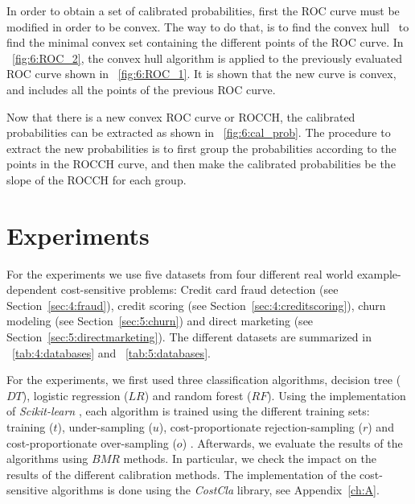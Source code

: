 In order to obtain a set of calibrated probabilities, first the ROC curve must be modified in 
order to be convex. The way to do that, is to find the convex \mbox{hull 
\citep{Hernandez-Orallo2012}} to find the minimal convex set containing the different 
points of the ROC curve. In \figurename{~\ref{fig:6:ROC_2}}, the convex hull algorithm is applied 
to the previously evaluated ROC curve shown in \figurename{~\ref{fig:6:ROC_1}}. It is shown that 
the new curve is convex, and includes all the points of the previous ROC curve.

Now that there is a new convex ROC curve or ROCCH, the calibrated probabilities can be extracted 
as shown in  \figurename{~\ref{fig:6:cal_prob}}. The procedure to extract the new probabilities is 
to first group the probabilities according to the points in the ROCCH curve, and then make the 
calibrated  probabilities be the slope of the ROCCH for each group.
  
   
\section{Experiments}
\label{sec:6:experiments}

For the experiments we use five datasets from four different real world example-dependent 
cost-sensitive problems: Credit card fraud detection (see Section~\ref{sec:4:fraud}), credit 
scoring (see Section~\ref{sec:4:creditscoring}), churn modeling (see Section~\ref{sec:5:churn}) and 
direct marketing (see Section~\ref{sec:5:directmarketing}). The different datasets are summarized 
in \tablename{~\ref{tab:4:databases}} and \tablename{~\ref{tab:5:databases}}.

For the experiments, we first used three classification algorithms, decision tree ($DT$), logistic 
  regression ($LR$) and random forest ($RF$). Using the implementation of \textit{Scikit-learn} 
  \citep{Pedregosa2011}, each algorithm is trained using the different training sets: training 
  ($t$), under-sampling ($u$), cost-proportionate rejection-sampling  ($r$) \citep{Zadrozny2003}   
  and   cost-proportionate over-sampling ($o$) \citep{Elkan2001}. Afterwards,  we evaluate the 
  results of  the algorithms using $BMR$ methods. In particular, we   check the impact on the 
  results of the different calibration methods. The implementation of the cost-sensitive algorithms 
  is done using the \textit{CostCla} library, see Appendix~\ref{ch:A}.
  
